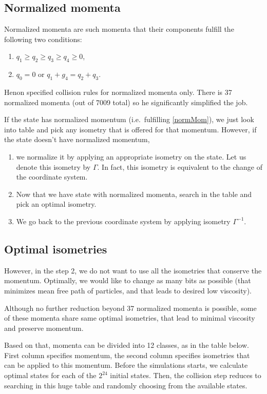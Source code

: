 \subsection{Normalized momenta}
Normalized momenta are such momenta that their components fulfill the following two conditions:
\begin{enumerate}
\item $q_1 \geq q_2 \geq q_3 \geq q_4 \geq 0$,  \label{normMom}
\item $q_0 = 0$ or $q_1+g_4 = q_2 + q_3$.
\end{enumerate}


Henon specified collision rules for normalized momenta only. There is 37 normalized momenta (out of 7009 total) so he significantly simplified the job.

If the state has normalized momentum (i.e.\ fulfilling \ref{normMom}), we just look into table and pick any isometry that is offered for that momentum. However, if the state doesn't have normalized momentum,
\begin{enumerate}
\item we normalize it by applying an appropriate isometry on the state. Let us denote this isometry by $\Gamma$. In fact, this isometry is equivalent to the change of the coordinate system.

\item Now that we have state with normalized momenta, search in the table and pick an optimal isometry.

\item We go back to the previous coordinate system by applying isometry $\Gamma^{-1}$.
\end{enumerate}

\subsection{Optimal isometries}

However, in the step 2, we do not want to use all the isometries that conserve the momentum.
Optimally, we would like to change as many bits as possible (that minimizes mean free path of particles, and that leads to desired low viscosity).

Although no further reduction beyond 37 normalized momenta is possible,
some of these momenta share same optimal isometries, that lead to minimal viscosity and preserve momentum.

Based on that,  momenta can be divided into 12 classes, as in the table below.
First column specifies momentum, the second column specifies isometries that can be applied to this momentum. 
Before the simulations starts, we calculate optimal states for each of the $2^{24}$ initial states. Then, the collision step reduces to searching in this huge table and randomly choosing from the available states.

